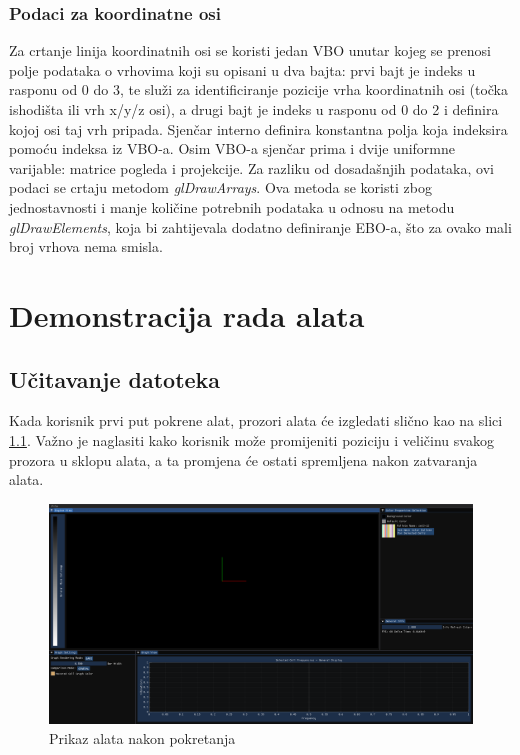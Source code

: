 \documentclass[times, utf8, diplomski]{fer}
\begin{document}
\subsection{Podaci za koordinatne osi}
Za crtanje linija koordinatnih osi se koristi jedan VBO unutar kojeg se prenosi polje podataka o vrhovima koji su opisani u dva bajta: prvi bajt je indeks u rasponu od 0 do 3, te služi za identificiranje pozicije vrha koordinatnih osi (točka ishodišta ili vrh x/y/z osi), a drugi bajt je indeks u rasponu od 0 do 2 i definira kojoj osi taj vrh pripada. Sjenčar interno definira konstantna polja koja indeksira pomoću indeksa iz VBO-a. Osim VBO-a sjenčar prima i dvije uniformne varijable: matrice pogleda i projekcije. Za razliku od dosadašnjih podataka, ovi podaci se crtaju metodom \textit{glDrawArrays}. Ova metoda se koristi zbog jednostavnosti i manje količine potrebnih podataka u odnosu na metodu \textit{glDrawElements}, koja bi zahtijevala dodatno definiranje EBO-a, što za ovako mali broj vrhova nema smisla.

\chapter{Demonstracija rada alata}

\section{Učitavanje datoteka}

Kada korisnik prvi put pokrene alat, prozori alata će izgledati slično kao na slici \ref{fig:initial-screenshot}. Važno je naglasiti kako korisnik može promijeniti poziciju i veličinu svakog prozora u sklopu alata, a ta promjena će ostati spremljena nakon zatvaranja alata.

\begin{figure} [H]
	\centering
    \includegraphics[width=\textwidth]{demonstration/initial_screenshot.png}
    \caption{Prikaz alata nakon pokretanja}
    \label{fig:initial-screenshot}
\end{figure}
\end{document}
